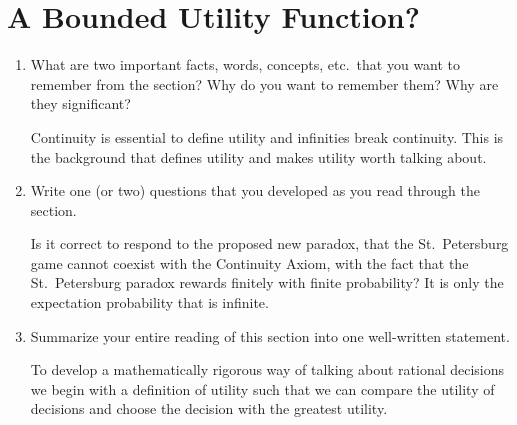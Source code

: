\documentclass[a4paper, 12pt]{config/homework}
\begin{document}
\section{A Bounded Utility Function?}
\begin{enumerate}[label=\roman*.]
\item What are two important facts, words, concepts, etc.\ that you want to remember from the section? Why do you want to remember them? Why are they significant?

Continuity is essential to define utility and infinities break continuity. This is the background that defines utility and makes utility worth talking about.

\item Write one (or two) questions that you developed as you read through the section.

Is it correct to respond to the proposed new paradox, that the St.\ Petersburg game cannot coexist with the Continuity Axiom, with the fact that the St.\ Petersburg paradox rewards finitely with finite probability? It is only the expectation probability that is infinite.

\item Summarize your entire reading of this section into one well-written statement.

To develop a mathematically rigorous way of talking about rational decisions we begin with a definition of utility such that we can compare the utility of decisions and choose the decision with the greatest utility.

\end{enumerate}
\end{document}
